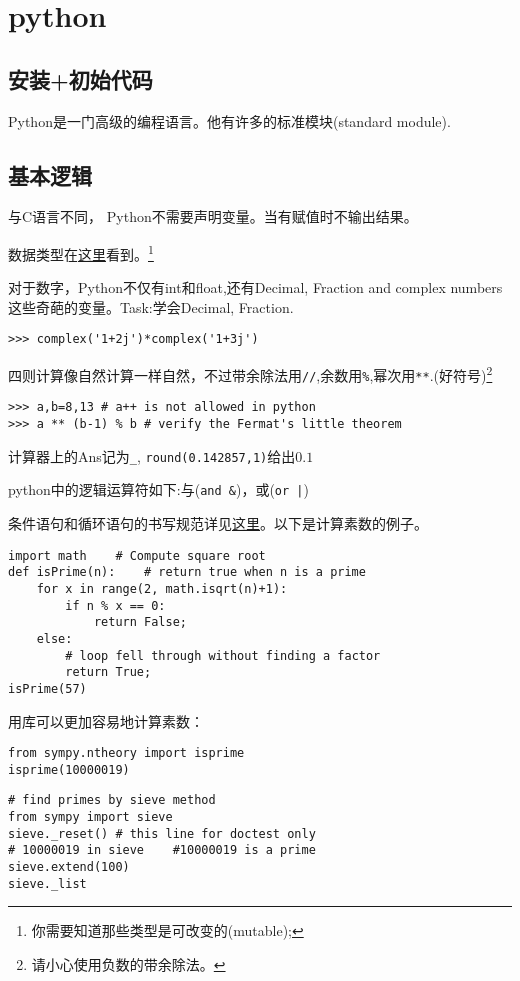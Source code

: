 \documentclass[11pt]{amsart}
\begin{document}
\section{python}
\subsection{安装+初始代码}
Python是一门高级的编程语言。他有许多的标准模块(standard module).
\subsection{基本逻辑}
与C语言不同， Python不需要声明变量。当有赋值时不输出结果。

数据类型在\href{https://docs.python.org/3/tutorial/introduction.html#id3}{这里}看到。\footnote{你需要知道那些类型是可改变的(mutable);}

对于数字，Python不仅有int和float,还有Decimal, Fraction and complex numbers这些奇葩的变量。Task:学会Decimal, Fraction.
\begin{lstlisting}[language=iPython]
>>> complex('1+2j')*complex('1+3j')
\end{lstlisting}
四则计算像自然计算一样自然，不过带余除法用\lstinline|//|,余数用\lstinline|%|,幂次用\lstinline|**|.(好符号)\footnote{请小心使用负数的带余除法。}
\begin{lstlisting}[language=iPython]
>>> a,b=8,13 # a++ is not allowed in python
>>> a ** (b-1) % b # verify the Fermat's little theorem
\end{lstlisting}
计算器上的Ans记为\lstinline|_|, \lstinline|round(0.142857,1)|给出$0.1$

python中的逻辑运算符如下:与(\lstinline|and &|)，或(\lstinline{or |})

条件语句和循环语句的书写规范详见\href{https://docs.python.org/3/tutorial/controlflow.html}{这里}。以下是计算素数的例子。
\begin{lstlisting}[language=iPython]
import math    # Compute square root
def isPrime(n):    # return true when n is a prime
    for x in range(2, math.isqrt(n)+1):
        if n % x == 0:
            return False;
    else:
        # loop fell through without finding a factor
        return True;
isPrime(57)
\end{lstlisting}
用库可以更加容易地计算素数：
\begin{lstlisting}[language=iPython]
from sympy.ntheory import isprime
isprime(10000019)
\end{lstlisting}
\begin{lstlisting}[language=iPython]
# find primes by sieve method
from sympy import sieve
sieve._reset() # this line for doctest only
# 10000019 in sieve    #10000019 is a prime
sieve.extend(100)
sieve._list
\end{lstlisting}
\end{document}
